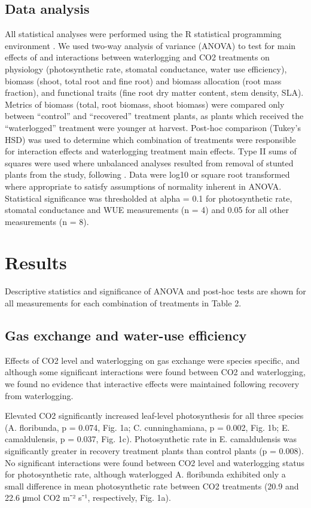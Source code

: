 \documentclass[12pt,a4paper]{memoir}
\begin{document}
\subsection*{Data analysis}
All statistical analyses were performed using the R statistical programming environment  \cite{RCoreTeam2015}. We used two-way analysis of variance (ANOVA) to test for main effects of and interactions between waterlogging and CO2 treatments on physiology (photosynthetic rate, stomatal conductance, water use efficiency), biomass (shoot, total root and fine root) and biomass allocation (root mass fraction), and functional traits (fine root dry matter content, stem density, SLA). Metrics of biomass (total, root biomass, shoot biomass) were compared only between “control” and “recovered” treatment plants, as plants which received the “waterlogged” treatment were younger at harvest. Post-hoc comparison (Tukey’s HSD) was used to determine which combination of treatments were responsible for interaction effects and waterlogging treatment main effects. Type II sums of squares were used where unbalanced analyses resulted from removal of stunted plants from the study, following \cite{Lansgrud2003}. Data were log10 or square root transformed where appropriate to satisfy assumptions of normality inherent in ANOVA. Statistical significance was thresholded at alpha = 0.1 for photosynthetic rate, stomatal conductance and WUE measurements (n = 4) and 0.05 for all other measurements (n = 8).

\newpage

\section{Results}
Descriptive statistics and significance of ANOVA and post-hoc tests are shown for all measurements for each combination of treatments in Table 2. 

\subsection*{Gas exchange and water-use efficiency}
Effects of CO2 level and waterlogging on gas exchange were species specific, and although some significant interactions were found between CO2 and waterlogging, we found no evidence that interactive effects were maintained following recovery from waterlogging. 

Elevated CO2 significantly increased leaf-level photosynthesis for all three species (A. floribunda, p = 0.074, Fig. 1a; C. cunninghamiana, p = 0.002, Fig. 1b; E. camaldulensis, p = 0.037, Fig. 1c). Photosynthetic rate in E. camaldulensis was significantly greater in recovery treatment plants than control plants (p = 0.008). No significant interactions were found between CO2 level and waterlogging status for photosynthetic rate, although waterlogged A. floribunda exhibited only a small difference in mean photosynthetic rate between CO2 treatments (20.9 and 22.6 μmol CO2 m⁻² s⁻¹, respectively, Fig. 1a).
\end{document}
